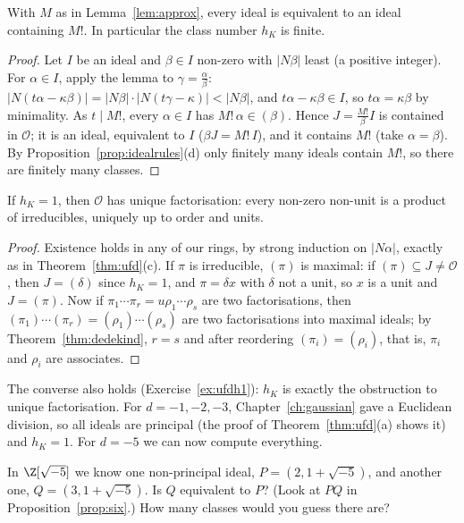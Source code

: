 \begin{theorem}\label{thm:classfinite}
With $M$ as in Lemma~\ref{lem:approx}, every ideal is equivalent to an ideal containing $M!$. In particular the class number $h_K$ is finite.
\end{theorem}
\begin{proof}
Let $I$ be an ideal and $\beta\in I$ non-zero with $|N\beta|$ least (a positive integer). For $\alpha\in I$, apply the lemma to $\gamma=\frac\alpha\beta$: $|N(t\alpha-\kappa\beta)|=|N\beta|\cdot|N(t\gamma-\kappa)|<|N\beta|$, and $t\alpha-\kappa\beta\in I$, so $t\alpha=\kappa\beta$ by minimality. As $t\mid M!$, every $\alpha\in I$ has $M!\,\alpha\in(\beta)$. Hence $J=\frac{M!}\beta I$ is contained in $\mathcal O$; it is an ideal, equivalent to $I$ ($\beta J=M!\,I$), and it contains $M!$ (take $\alpha=\beta$). By Proposition~\ref{prop:idealrules}(d) only finitely many ideals contain $M!$, so there are finitely many classes.
\end{proof}

\begin{proposition}\label{prop:h1}
If $h_K=1$, then $\mathcal O$ has unique factorisation: every non-zero non-unit is a product of irreducibles, uniquely up to order and units.
\end{proposition}
\begin{proof}
Existence holds in any of our rings, by strong induction on $|N\alpha|$, exactly as in Theorem~\ref{thm:ufd}(c). If $\pi$ is irreducible, $(\pi)$ is maximal: if $(\pi)\subseteq J\ne\mathcal O$, then $J=(\delta)$ since $h_K=1$, and $\pi=\delta x$ with $\delta$ not a unit, so $x$ is a unit and $J=(\pi)$. Now if $\pi_1\cdots\pi_r=u\rho_1\cdots\rho_s$ are two factorisations, then $(\pi_1)\cdots(\pi_r)=(\rho_1)\cdots(\rho_s)$ are two factorisations into maximal ideals; by Theorem~\ref{thm:dedekind}, $r=s$ and after reordering $(\pi_i)=(\rho_i)$, that is, $\pi_i$ and $\rho_i$ are associates.
\end{proof}

The converse also holds (Exercise~\ref{ex:ufdh1}): $h_K$ is exactly the obstruction to unique factorisation. For $d=-1,-2,-3$, Chapter~\ref{ch:gaussian} gave a Euclidean division, so all ideals are principal (the proof of Theorem~\ref{thm:ufd}(a) shows it) and $h_K=1$. For $d=-5$ we can now compute everything.

\begin{think}
In $\Z[\sqrt{-5}]$ we know one non-principal ideal, $P=(2,1+\sqrt{-5})$, and another one, $Q=(3,1+\sqrt{-5})$. Is $Q$ equivalent to $P$? (Look at $PQ$ in Proposition~\ref{prop:six}.) How many classes would you guess there are?
\end{think}

